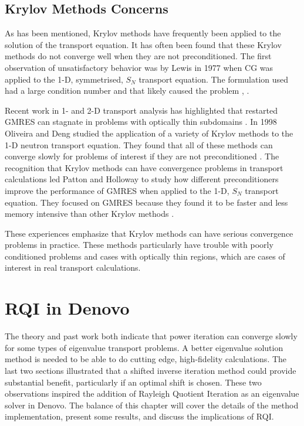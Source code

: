 \subsection{Krylov Methods Concerns}
As has been mentioned, Krylov methods have frequently been applied to the solution of the transport equation. It has often been found that these Krylov methods do not converge well when they are not preconditioned. The first observation of unsatisfactory behavior was by Lewis in 1977 when CG was applied to the 1-D, symmetrised, $S_{N}$ transport equation. The formulation used had a large condition number and that likely caused the problem \cite{Lewis1977}, \cite{Gupta2004}. 

Recent work in 1- and 2-D transport analysis has highlighted that restarted GMRES can stagnate in problems with optically thin subdomains \cite{Rosa2010}. In 1998 Oliveira and Deng studied the application of a variety of Krylov methods to the 1-D neutron transport equation. They found that all of these methods can converge slowly for problems of interest if they are not preconditioned \cite{Oliveira1998}. The recognition that Krylov methods can have convergence problems in transport calculations led Patton and Holloway to study how different preconditioners improve the performance of GMRES when applied to the 1-D, $S_{N}$ transport equation. They focused on GMRES because they found it to be faster and less memory intensive than other Krylov methods \cite{Patton2002}. 

These experiences emphasize that Krylov methods can have serious convergence problems in practice. These methods particularly have trouble with poorly conditioned problems and cases with optically thin regions, which are cases of interest in real transport calculations.  

\section{RQI in Denovo}
The theory and past work both indicate that power iteration can converge slowly for some types of eigenvalue transport problems. A better eigenvalue solution method is needed to be able to do cutting edge, high-fidelity calculations. The last two sections illustrated that a shifted inverse iteration method could provide substantial benefit, particularly if an optimal shift is chosen. These two observations inspired the addition of Rayleigh Quotient Iteration as an eigenvalue solver in Denovo. The balance of this chapter will cover the details of the method implementation, present some results, and discuss the implications of RQI.

